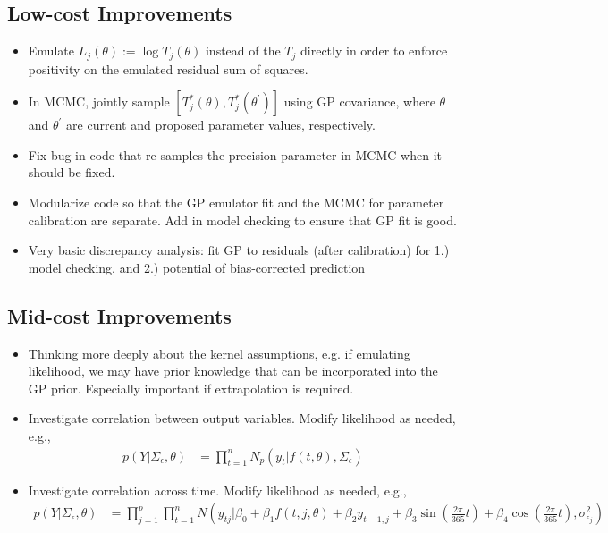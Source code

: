 \documentclass[12pt]{article}
\begin{document}
\subsection{Low-cost Improvements}
\begin{itemize}
\item Emulate $L_j(\theta) := \log T_j(\theta)$ instead of the $T_j$ directly in order to enforce positivity on the emulated residual sum of squares. 
\item In MCMC, jointly sample $[T_j^*(\theta), T_j^*(\theta^\prime)]$ using GP covariance, where $\theta$ and $\theta^\prime$ are current and proposed parameter values, respectively. 
\item Fix bug in code that re-samples the precision parameter in MCMC when it should be fixed. 
\item Modularize code so that the GP emulator fit and the MCMC for parameter calibration are separate. Add in model checking to ensure that GP fit is good. 
\item Very basic discrepancy analysis: fit GP to residuals (after calibration) for 1.) model checking, and 2.) potential of bias-corrected prediction
\end{itemize}

\subsection{Mid-cost Improvements}
\begin{itemize}
\item Thinking more deeply about the kernel assumptions, e.g. if emulating likelihood, we may have prior knowledge that can be incorporated into the GP prior. Especially important if extrapolation is required.
\item Investigate correlation between output variables. Modify likelihood as needed, e.g.,
	\begin{align}
	p(Y|\Sigma_\epsilon, \theta) &= \prod_{t = 1}^{n} N_p(y_{t}|f(t, \theta), \Sigma_{\epsilon}) \label{ind_output_corr}
	\end{align}
\item Investigate correlation across time. Modify likelihood as needed, e.g., 
	\begin{align}
	p(Y|\Sigma_\epsilon, \theta) &= \prod_{j = 1}^{p} \prod_{t = 1}^{n} N\left(y_{tj}|\beta_0 + \beta_1 f(t, j, \theta) + \beta_2 y_{t-1,j} + \beta_3 \sin\left(\frac{2\pi}{365}t\right) + \beta_4 \cos\left(\frac{2\pi}{365}t\right), \sigma^2_{\epsilon_j}\right) \label{ind_autocorr}
	\end{align}
\end{itemize}
\end{document}
